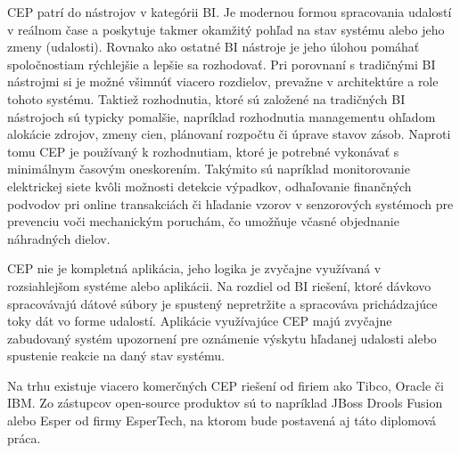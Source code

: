 	CEP patrí do nástrojov v kategórii \ac{BI}. Je modernou formou spracovania udalostí v reálnom čase a poskytuje takmer okamžitý pohľad na stav systému alebo jeho zmeny (udalosti). Rovnako ako ostatné BI nástroje je jeho úlohou pomáhať spoločnostiam rýchlejšie a lepšie sa rozhodovať.
	Pri porovnaní s tradičnými BI nástrojmi si je možné všimnúť viacero rozdielov, prevažne v architektúre a role tohoto systému. Taktiež rozhodnutia, ktoré sú založené na tradičných BI nástrojoch sú typicky pomalšie, napríklad rozhodnutia managementu ohľadom alokácie zdrojov, zmeny cien, plánovaní rozpočtu či úprave stavov zásob.
	Naproti tomu CEP je používaný k rozhodnutiam, ktoré je potrebné vykonávať s minimálnym časovým oneskorením. Takýmito sú napríklad monitorovanie elektrickej siete kvôli možnosti detekcie výpadkov, odhaľovanie finančných podvodov pri online transakciách či hľadanie vzorov v senzorových systémoch pre prevenciu voči mechanickým poruchám, čo umožňuje včasné objednanie náhradných dielov.
	
	CEP nie je kompletná aplikácia, jeho logika je zvyčajne využívaná v rozsiahlejšom systéme alebo aplikácii. Na rozdiel od BI riešení, ktoré dávkovo spracovávajú dátové súbory je spustený nepretržite a spracováva prichádzajúce toky dát vo forme udalostí. Aplikácie využívajúce CEP majú zvyčajne zabudovaný systém upozornení pre oznámenie výskytu hľadanej udalosti alebo spustenie reakcie na daný stav systému. 
	
	Na trhu existuje viacero komerčných CEP riešení od firiem ako Tibco, Oracle či IBM. Zo zástupcov open-source produktov sú to napríklad JBoss Drools Fusion alebo Esper od firmy EsperTech, na ktorom bude postavená aj táto diplomová práca.


